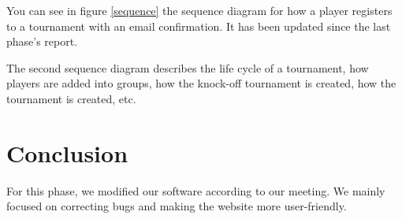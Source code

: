 \documentclass[a4paper, 12pt]{article}
\begin{document}
You can see in figure \ref{sequence} the sequence diagram for how a player registers to a tournament with an email confirmation. It has been updated since the last phase's report.

The second sequence diagram describes the life cycle of a tournament, how players are added into groups, how the knock-off tournament is created, how the tournament is created, etc. 



\section{Conclusion}

For this phase, we modified our software according to our meeting. We mainly focused on correcting bugs and making the website more user-friendly.
\end{document}
